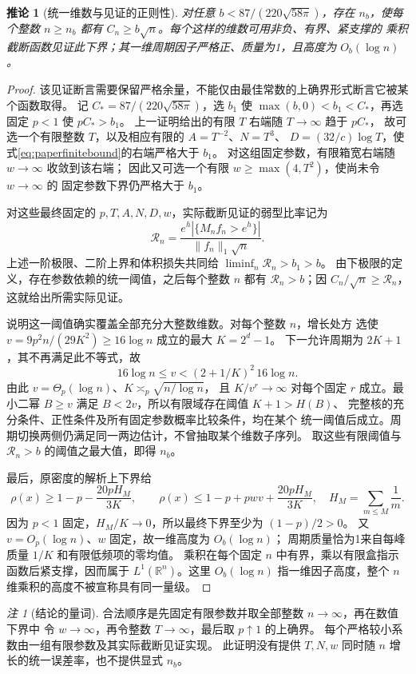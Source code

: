 \documentclass[UTF8,a4paper,11pt,fontset=fandol]{ctexart}
\newtheorem{corollary}[lemma]{推论}
\theoremstyle{remark}
\newtheorem{remark}[lemma]{注}
\begin{document}
\begin{corollary}[统一维数与见证的正则性]\label{cor:paperwitness}
对任意 $b<87/(220\sqrt{58\pi})$，存在 $n_b$，使每个整数 $n\ge n_b$
都有 $C_n\ge b\sqrt n$。每个这样的维数可用非负、有界、紧支撑的
乘积截断函数见证此下界；其一维周期因子严格正、质量为1，且高度为
$O_b(\log n)$。
\end{corollary}
\begin{proof}
该见证断言需要保留严格余量，不能仅由最佳常数的上确界形式断言它被某个函数取得。
记 $C_*=87/(220\sqrt{58\pi})$，选 $b_1$ 使
$\max(b,0)<b_1<C_*$，再选固定 $p<1$ 使 $pC_*>b_1$。
上一证明给出的有限 $T$ 右端随 $T\to\infty$ 趋于 $pC_*$，
故可选一个有限整数 $T$，以及相应有限的 $A=T^{-2}$、$N=T^3$、
$D=(32/c)\log T$，使式\eqref{eq:paperfinitebound}的右端严格大于 $b_1$。
对这组固定参数，有限箱宽右端随 $w\to\infty$ 收敛到该右端；
因此又可选一个有限 $w\ge\max(4,T^2)$，使尚未令 $w\to\infty$ 的
固定参数下界仍严格大于 $b_1$。

对这些最终固定的 $p,T,A,N,D,w$，实际截断见证的弱型比率记为
\[
 \mathcal R_n=\frac{e^h|\{M_nf_n>e^h\}|}{\|f_n\|_1\sqrt n}.
\]
上述一阶极限、二阶上界和体积损失共同给
$\liminf_n\mathcal R_n>b_1>b$。
由下极限的定义，存在参数依赖的统一阈值，之后每个整数 $n$ 都有
$\mathcal R_n>b$；因 $C_n/\sqrt n\ge\mathcal R_n$，这就给出所需实际见证。

说明这一阈值确实覆盖全部充分大整数维数。对每个整数 $n$，增长处方
选使 $v=9p^2n/(29K^2)\ge16\log n$ 成立的最大 $K=2^d-1$。
下一允许周期为 $2K+1$，其不再满足此不等式，故
\[
 16\log n\le v<(2+1/K)^2\,16\log n.
\]
由此 $v=\Theta_p(\log n)$、$K\asymp_p\sqrt{n/\log n}$，
且 $K/v^r\to\infty$ 对每个固定 $r$ 成立。最小二幂 $B\ge v$
满足 $B<2v$，所以有限域存在阈值 $K+1>H(B)$、
完整核的充分条件、正性条件及所有固定参数概率比较条件，均在某个
统一阈值后成立。周期切换两侧仍满足同一两边估计，不曾抽取某个维数子序列。
取这些有限阈值与 $\mathcal R_n>b$ 的阈值之最大值，即得 $n_b$。

最后，原密度的解析上下界给
\[
 \rho(x)\ge1-p-\frac{20pH_M}{3K},\qquad
 \rho(x)\le1-p+pwv+\frac{20pH_M}{3K},
 \quad H_M=\sum_{m\le M}\frac1m.
\]
因为 $p<1$ 固定，$H_M/K\to0$，所以最终下界至少为 $(1-p)/2>0$。
又 $v=O_p(\log n)$、$w$ 固定，故一维高度为 $O_b(\log n)$；
周期质量恰为1来自每峰质量 $1/K$ 和有限低频项的零均值。
乘积在每个固定 $n$ 中有界，乘以有限盒指示函数后紧支撑，因而属于
$L^1(\mathbb R^n)$。这里 $O_b(\log n)$ 指一维因子高度，整个
$n$ 维乘积的高度不被宣称具有同一量级。
\end{proof}

\begin{remark}[结论的量词]
合法顺序是先固定有限参数并取全部整数 $n\to\infty$，再在数值下界中
令 $w\to\infty$，再令整数 $T\to\infty$，最后取 $p\uparrow1$ 的上确界。
每个严格较小系数由一组有限参数及其实际截断见证实现。
此证明没有提供 $T,N,w$ 同时随 $n$ 增长的统一误差率，也不提供显式 $n_b$。
\end{remark}
\end{document}
